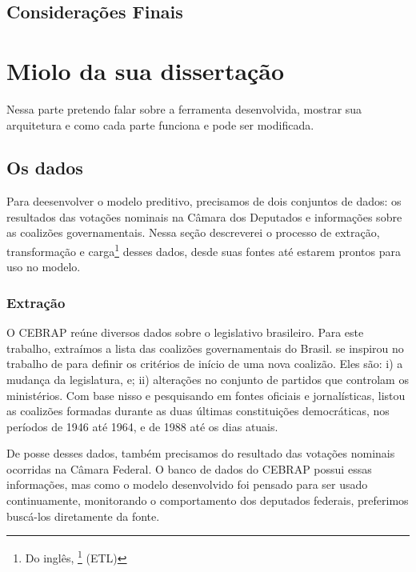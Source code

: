 \documentclass[a4paper,titlepage]{ppgi}\usepackage[]{graphicx}\usepackage[]{color}
\begin{document}
\section{Considerações Finais}









\chapter{Miolo da sua dissertação}\label{cap:miolo}

Nessa parte pretendo falar sobre a ferramenta desenvolvida, mostrar sua arquitetura e como cada parte funciona e pode ser modificada.

\section{Os dados}

Para deesenvolver o modelo preditivo, precisamos de dois conjuntos de dados: os
resultados das votações nominais na Câmara dos Deputados e informações sobre as
coalizões governamentais. Nessa seção descreverei o processo de extração,
transformação e carga\footnote{Do inglês, \footnote{extract, transform, load}
(ETL)} desses dados, desde suas fontes até estarem prontos para uso no modelo.

\subsection{Extração}
\label{sec:miolo:extracao}

O \gls{CEBRAP} reúne diversos dados sobre o legislativo brasileiro. Para este
trabalho, extraímos a lista das coalizões governamentais do Brasil.
 se inspirou no trabalho de 
para definir os critérios de início de uma nova coalizão. Eles são: i) a
mudança da legislatura, e; ii) alterações no conjunto de partidos que controlam
os ministérios. Com base nisso e pesquisando em fontes oficiais e
jornalísticas, \citeauthor{Figueiredo2007} listou as coalizões formadas
durante as duas últimas constituições democráticas, nos períodos de 1946 até
1964, e de 1988 até os dias atuais.

De posse desses dados, também precisamos do resultado das votações nominais
ocorridas na Câmara Federal. O banco de dados do \gls{CEBRAP} possui essas
informações, mas como o modelo desenvolvido foi pensado para ser usado
continuamente, monitorando o comportamento dos deputados federais, preferimos
buscá-los diretamente da fonte.
\end{document}
